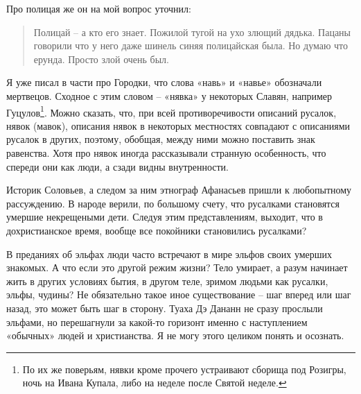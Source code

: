 Про полицая же он на мой вопрос уточнил:

\begin{quotation}
Полицай – а кто его знает. Пожилой тугой на ухо злющий дядька. Пацаны говорили что у него даже шинель синяя полицайская была. Но думаю что ерунда. Просто злой очень был.
\end{quotation}

Я уже писал в части про Городки, что слова «навь» и «навье» обозначали мертвецов. Сходное с этим словом – «нявка» у некоторых Славян, например Гуцулов\footnote{По их же поверьям, нявки кроме прочего устраивают сборища под Розигры, ночь на Ивана Купала, либо на неделе после Святой неделе.}. Можно сказать, что, при всей противоречивости описаний русалок, нявок (мавок), описания нявок в некоторых местностях совпадают с описаниями русалок в других, поэтому, обобщая, между ними можно поставить знак равенства. Хотя про нявок иногда рассказывали странную особенность, что спереди они как люди, а сзади видны внутренности.



Историк Соловьев, а следом за ним этнограф Афанасьев  пришли к любопытному рассуждению. В народе верили, по большому счету, что русалками становятся умершие некрещеными дети. Следуя этим представлениям, выходит, что в дохристианское время, вообще все покойники становились русалками?

В преданиях об эльфах люди часто встречают в мире эльфов своих умерших знакомых. А что если это другой режим жизни? Тело умирает, а разум начинает жить в других условиях бытия, в другом теле, зримом людьми как русалки, эльфы, чудины? Не обязательно такое иное существование – шаг вперед или шаг назад, это может быть шаг в сторону. Туаха Дэ Дананн не сразу прослыли эльфами, но перешагнули за какой-то горизонт именно с наступлением «обычных» людей и христианства. Я не могу этого целиком понять и осознать.

